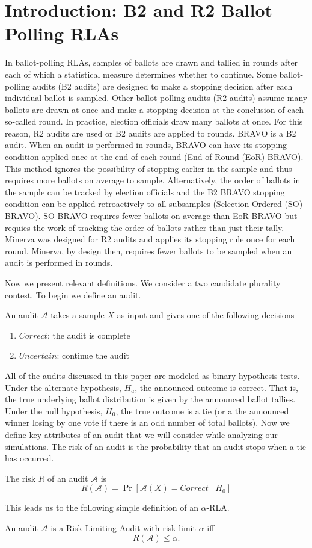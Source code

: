\documentclass[runningheads]{llncs}
\begin{document}
\section{Introduction: B2 and R2 Ballot Polling RLAs}
In ballot-polling RLAs, samples of ballots are drawn and tallied
in rounds
after each of which a statistical measure determines whether to
continue. 
Some ballot-polling audits (B2 audits) 
are designed to make a stopping decision
after each individual ballot is sampled.
Other ballot-polling audits (R2 audits) assume many ballots are drawn
at once and make a stopping decision at the conclusion of each 
so-called round.
In practice, election officials draw many ballots at once.
For this reason, R2 audits are used or B2 audits are applied to 
rounds.
BRAVO is a B2 audit. 
When an audit is performed in rounds, BRAVO can have its
stopping condition applied once at the end of each round
(End-of Round (EoR) BRAVO).
This method ignores the possibility of stopping earlier in the 
sample and thus requires more ballots on average to sample.
Alternatively, the order of ballots in the sample can be tracked
by election officials and the B2 BRAVO stopping condition can 
be applied retroactively to all subsamples 
(Selection-Ordered (SO) BRAVO).
SO BRAVO requires fewer ballots on average than EoR BRAVO but
requies the work of tracking the order of ballots rather than
just their tally.
Minerva was designed for R2 audits and applies its stopping rule
once for each round.
Minerva, by design then, requires fewer ballots to be sampled when 
an audit is performed in rounds.

Now we present relevant definitions.
We consider a two candidate plurality contest.
To begin we define an audit.
\begin{definition}
An audit $\mathcal{A}$ takes a sample $X$ as input and gives one of the 
following decisions
\begin{enumerate}
\item
$Correct$: the audit is complete
\item
$Uncertain$: continue the audit
\end{enumerate}
\end{definition}
All of the audits discussed in this paper are modeled as binary hypothesis tests.
Under the alternate hypothesis, $H_a$, the announced outcome is correct. 
That is, the true underlying ballot distribution is given by the announced ballot tallies.
Under the null hypothesis, $H_0$, the true outcome is a tie 
(or a the announced winner losing by one vote if there is an odd number of total ballots).
Now we define key attributes of an audit that we will consider while analyzing our simulations.
The risk of an audit is the probability that an audit stops when a tie has occurred.
\begin{definition}[Risk]
The risk $R$ of an audit $\mathcal{A}$ is
$$R(\mathcal{A})=\Pr[\mathcal{A}(X)=Correct \mid H_0]$$
\end{definition}
This leads us to the following simple definition of an $\alpha$-RLA.
\begin{definition}
An audit $\mathcal{A}$ is a Risk Limiting Audit with 
risk limit $\alpha$ iff 
$$R(\mathcal{A}) \le \alpha.$$
\end{definition}
\end{document}
